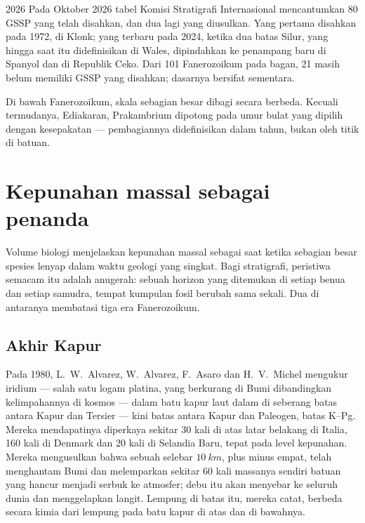 \begin{dated}{2026}
Pada Oktober 2026 tabel Komisi Stratigrafi Internasional mencantumkan 80 GSSP yang telah disahkan, dan dua lagi yang diusulkan. Yang pertama disahkan pada 1972, di Klonk; yang terbaru pada 2024, ketika dua batas Silur, yang hingga saat itu didefinisikan di Wales, dipindahkan ke penampang baru di Spanyol dan di Republik Ceko. Dari 101  Fanerozoikum pada bagan, 21 masih belum memiliki GSSP yang disahkan; dasarnya bersifat sementara.
\end{dated}

Di bawah Fanerozoikum, skala sebagian besar dibagi secara berbeda. Kecuali  termudanya, Ediakaran, Prakambrium dipotong pada umur bulat yang dipilih dengan kesepakatan --- pembagiannya didefinisikan dalam tahun, bukan oleh titik di batuan.

\section{Kepunahan massal sebagai penanda}\label{sec:b1:stratigraphic-scale:extinctions}

Volume biologi menjelaskan kepunahan massal sebagai saat ketika sebagian besar spesies lenyap dalam waktu geologi yang singkat. Bagi stratigrafi, peristiwa semacam itu adalah anugerah: sebuah horizon yang ditemukan di setiap benua dan setiap samudra, tempat kumpulan fosil berubah sama sekali. Dua di antaranya membatasi tiga era Fanerozoikum.

\subsection*{Akhir Kapur}

Pada 1980, L.~W.~Alvarez, W.~Alvarez, F.~Asaro dan H.~V.~Michel mengukur iridium --- salah satu logam platina, yang berkurang di  Bumi dibandingkan kelimpahannya di kosmos --- dalam batu kapur laut dalam di seberang batas antara Kapur dan Tersier --- kini batas antara Kapur dan Paleogen, batas K--Pg. Mereka mendapatinya diperkaya sekitar 30 kali di atas latar belakang di Italia, 160 kali di Denmark dan 20 kali di Selandia Baru, tepat pada level kepunahan. Mereka mengusulkan bahwa sebuah  selebar $\qty{10}{km}$, plus minus empat, telah menghantam Bumi dan melemparkan sekitar 60 kali massanya sendiri batuan yang hancur menjadi serbuk ke atmosfer; debu itu akan menyebar ke seluruh dunia dan menggelapkan langit. Lempung di batas itu, mereka catat, berbeda secara kimia dari lempung pada batu kapur di atas dan di bawahnya.

